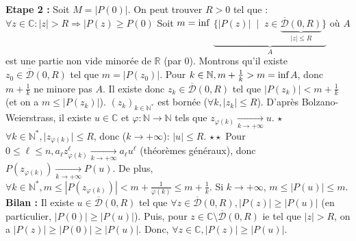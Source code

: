 \documentclass[12pt,a4paper]{report}
\begin{document}
\textbf{Etape 2 :}
\newline Soit $M = \lvert P(0) \rvert$. On peut trouver $R>0$ tel que : $\forall z \in \mathbb{C} : \lvert z \rvert > R \Longrightarrow \lvert P(z) \geq P(0)$
\newline Soit $m = \rm{inf}\;$$\underbrace{\{ \lvert P(z) \rvert \; \mid \; z \in \underbrace{\overline{\mathcal{D}}(0,R)}_{\lvert z \rvert \leq R} \}}_{A}$ où $A$ est une partie non vide minorée de $\mathbb{R}$ (par $0$).
\newline Montrons qu'il existe $z_0 \in \overline{\mathcal{D}}(0,R)$ tel que $m = \lvert P(z_0) \rvert$. Pour $k \in \mathbb{N}, m + \frac{1}{k} > m  = \rm{inf}$$A$, donc $m + \frac{1}{k}$ ne minore pas $A$.
\newline Il existe donc $z_k \in \overline{\mathcal{D}}(0,R)$ tel que $\lvert P(z_k) \rvert < m + \frac{1}{k}$ (et on a $m \leq \lvert P(z_k) \rvert$).
\newline $(z_k)_{k \in \mathbb{N}^*}$ est bornée ($\forall k, \lvert z_k \rvert \leq R$).
\newline D'après Bolzano-Weierstrass, il existe $u \in \mathbb{C}$ et $\varphi : \mathbb{N} \rightarrow \mathbb{N}$ tels que $z_{\varphi(k)} \xrightarrow[k \rightarrow +\infty]{} u$.
\newline $\star$ $\forall k \in \mathbb{N}^*, \lvert z_{\varphi(k)} \rvert \leq R$, donc ($k \rightarrow +\infty$): $\lvert u \rvert \leq R$.
\newline $\star \star$ Pour $0 \leq \ell \leq n, a_\ell z_{\varphi(k)}^\ell \xrightarrow[k \rightarrow +\infty]{} a_\ell u^\ell$ (théorèmes généraux), donc $P\left(z_{\varphi(k)}\right) \xrightarrow[k \rightarrow +\infty]{} P(u)$.
\newline De plus, $\forall k \in \mathbb{N}^*, m \leq \left \lvert P\left(z_{\varphi(k)}\right)\right \rvert < m + \frac{1}{\varphi(k)} \leq m + \frac{1}{k}$. Si $k \rightarrow +\infty$, $m \leq \lvert P(u) \rvert \leq m$.
\newline \newline \textbf{Bilan :} Il existe $u \in \overline{\mathcal{D}}(0,R)$ tel que $\forall z \in \overline{\mathcal{D}}(0,R), \lvert P(z) \rvert \geq \lvert P(u) \rvert$ (en particulier, $\lvert P(0) \rvert \geq \lvert P(u) \rvert$).
\newline Puis, pour $z \in \mathbb{C} \setminus \overline{\mathcal{D}}(0,R)$ ie tel que $\lvert z \rvert > R$, on a $\lvert P(z) \rvert \geq \lvert P(0) \rvert \geq \lvert P(u) \rvert$.
\newline Donc, $\forall z \in \mathbb{C}, \lvert P(z) \rvert \geq \lvert P(u) \rvert$.
\end{document}
